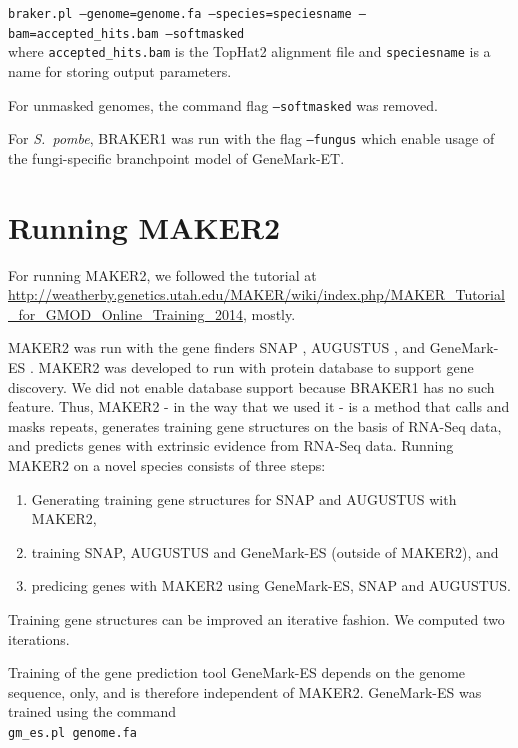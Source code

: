 \documentclass[a4paper,10pt]{report}
\begin{document}
\noindent \texttt{braker.pl --genome=genome.fa --species=speciesname --bam=accepted\_hits.bam --softmasked}\\

\noindent where \texttt{accepted\_hits.bam} is the TopHat2 alignment file and \texttt{speciesname} is a name for storing output parameters.

\noindent For unmasked genomes, the command flag \texttt{--softmasked} was removed.

\noindent For \textit{S.~pombe}, BRAKER1 was run with the flag \texttt{--fungus} which enable usage of the fungi-specific branchpoint model of GeneMark-ET.

\section{Running MAKER2}

For running MAKER2, we followed the tutorial at \url{http://weatherby.genetics.utah.edu/MAKER/wiki/index.php/MAKER_Tutorial_for_GMOD_Online_Training_2014}, mostly.

MAKER2 was run with the gene finders SNAP \cite{SNAP}, AUGUSTUS \cite{AUGUSTUS}, and GeneMark-ES \cite{GeneMark-ES}. MAKER2 was developed to run with protein database to support gene discovery. We did not enable database support because BRAKER1 has no such feature. Thus, MAKER2 - in the way that we used it - is a method that calls and masks repeats, generates training gene structures on the basis of RNA-Seq data, and predicts genes with extrinsic evidence from RNA-Seq data. Running MAKER2 on a novel species consists of three steps: 

\begin{enumerate}
 \item Generating training gene structures for SNAP and AUGUSTUS with MAKER2,
 \item training SNAP, AUGUSTUS and GeneMark-ES (outside of MAKER2), and
 \item predicing genes with MAKER2 using GeneMark-ES, SNAP and AUGUSTUS.
\end{enumerate}

\noindent Training gene structures can be improved an iterative fashion. We computed two iterations.

Training of the gene prediction tool GeneMark-ES depends on the genome sequence, only, and is therefore independent of MAKER2. GeneMark-ES was trained using the command\\

\noindent \texttt{gm\_es.pl genome.fa}
\end{document}
